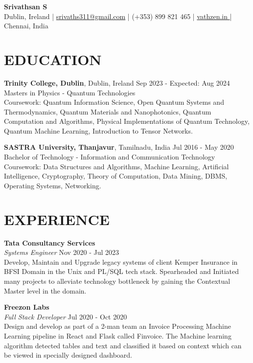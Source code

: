 \documentclass[a4paper,9pt]{extarticle}
\begin{document}
\pagestyle{empty}

\begin{center}
    \textbf{\Large Srivathsan S}\\[2pt]
    Dublin, Ireland | \href{mailto:srivaths311@gmail.com}{srivaths311@gmail.com} | (+353) 899 821 465 | \href{https://www.vathzen.in}{vathzen.in \faExternalLink} | Chennai, India 
\end{center}

\section*{EDUCATION}
\noindent
\textbf{Trinity College, Dublin}, Dublin, Ireland \hfill Sep 2023 - Expected: Aug 2024\\[1pt] 
Masters in Physics - Quantum Technologies\\[1pt]
Coursework: Quantum Information Science, Open Quantum Systems and Thermodynamics, Quantum Materials and Nanophotonics,
Quantum Computation and Algorithms, Physical Implementations of Quantum Technology, Quantum Machine Learning, Introduction to
Tensor Networks.

\noindent
\textbf{SASTRA University, Thanjavur}, Tamilnadu, India \hfill Jul 2016 - May 2020\\[1pt] 
Bachelor of Technology - Information and Communication Technology\\[1pt]
Coursework: Data Structures and Algorithms, Machine Learning, Artificial Intelligence, Cryptography, Theory of Computation, Data Mining,
DBMS, Operating Systems, Networking.

\section*{EXPERIENCE}
\noindent
\textbf{Tata Consultancy Services}\\[1pt]
\textit{Systems Engineer} \hfill Nov 2020 - Jul 2023\\[1pt]
Develop, Maintain and Upgrade legacy systems of client Kemper Insurance in BFSI Domain in the Unix and PL/SQL tech stack.
Spearheaded and Initiated many projects to alleviate technology bottleneck by gaining the Contextual Master level in the
domain.

\noindent
\textbf{Freezon Labs}\\[1pt]
\textit{Full Stack Developer} \hfill Jul 2020 - Oct 2020\\[1pt]
Design and develop as part of a 2-man team an Invoice Processing Machine Learning pipeline in React and Flask called Finvoice.
The Machine learning algorithm detected tables and text and classified it based on context which can be viewed in specially designed dashboard.
\end{document}
